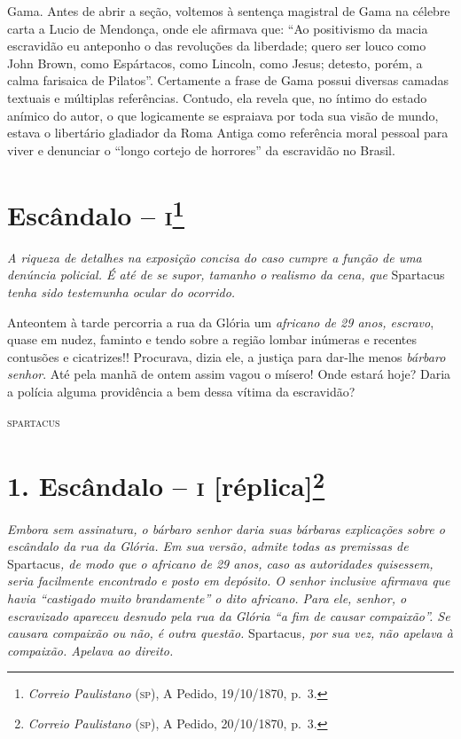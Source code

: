 {\begin{argumento}
{Gama. Antes de abrir a seção, voltemos à sentença magistral de Gama na
célebre carta a Lucio de Mendonça, onde ele afirmava que: ``Ao
positivismo da macia escravidão eu anteponho o das revoluções da
liberdade; quero ser louco como John Brown, como Espártacos, como
Lincoln, como Jesus; detesto, porém, a calma farisaica de Pilatos''.
Certamente a frase de Gama possui diversas camadas textuais e múltiplas
referências. Contudo, ela revela que, no íntimo do estado anímico do
autor, o que logicamente se espraiava por toda sua visão de mundo,
estava o libertário gladiador da Roma Antiga como referência moral
pessoal para viver e denunciar o ``longo cortejo de horrores'' da
escravidão no Brasil.}
\end{argumento}

\chapter{Escândalo -- \textsc{i}\footnote{\emph{Correio Paulistano} (\textsc{sp}), A Pedido, 19/10/1870,
  p.~3.}} %

\begin{didascalia}
\emph{A riqueza de detalhes na exposição concisa do caso cumpre a função
de uma denúncia policial. É até de se supor, tamanho o realismo da cena,
que} Spartacus \emph{tenha sido testemunha ocular do ocorrido.}
\end{didascalia}

Anteontem à tarde percorria a rua da Glória um \emph{africano de 29
anos, escravo}, quase em nudez, faminto e tendo sobre a região lombar
inúmeras e recentes contusões e cicatrizes!! Procurava, dizia ele, a
justiça para dar-lhe menos \emph{bárbaro senhor}. Até pela manhã de
ontem assim vagou o mísero! Onde estará hoje? Daria a polícia alguma
providência a bem dessa vítima da escravidão?

\begin{flushright}
\textsc{spartacus}
\end{flushright}

\chapter{1. Escândalo -- \textsc{i} {[}réplica{]}\footnote{\emph{Correio Paulistano} (\textsc{sp}), A Pedido, 20/10/1870,
  p.~3.}} %

\begin{didascalia}
\emph{Embora sem assinatura, o bárbaro senhor daria suas bárbaras
explicações sobre o escândalo da rua da Glória. Em sua versão, admite
todas as premissas de} Spartacus\emph{, de modo que o africano de 29
anos, caso as autoridades quisessem, seria facilmente encontrado e posto
em depósito. O senhor inclusive afirmava que havia ``castigado muito
brandamente'' o dito africano. Para ele, senhor, o escravizado apareceu
desnudo pela rua da Glória ``a fim de causar compaixão''. Se causara
compaixão ou não, é outra questão.} Spartacus\emph{, por sua vez, não
apelava à compaixão. Apelava ao direito.}
\end{didascalia}


}
